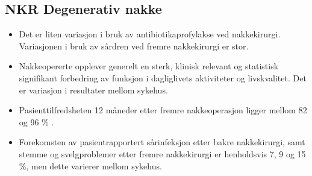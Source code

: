 \documentclass [norsk,a4paper,twoside]{article}\usepackage[]{graphicx}\usepackage[]{color}
\begin{document}
\subsection*{NKR Degenerativ nakke}
\begin{itemize}
\item Det er liten variasjon i bruk av antibiotikaprofylakse ved nakkekirurgi. Variasjonen i bruk av sårdren ved fremre nakkekirurgi er stor.
\item Nakkeopererte opplever generelt en sterk, klinisk relevant og statistisk
signifikant forbedring av funksjon i dagliglivets aktiviteter og livskvalitet. Det er variasjon i resultater mellom sykehus.
\item Pasienttilfredsheten 12 måneder etter fremre nakkeoperasjon ligger mellom 82 og 96 \% .
\item Forekomsten av pasientrapportert sårinfeksjon etter bakre nakkekirurgi, samt stemme og svelgproblemer etter fremre nakkekirurgi er henholdsvis 7, 9 og 15 \%, men dette varierer mellom sykehus.
\end{itemize} 
\end{document}
